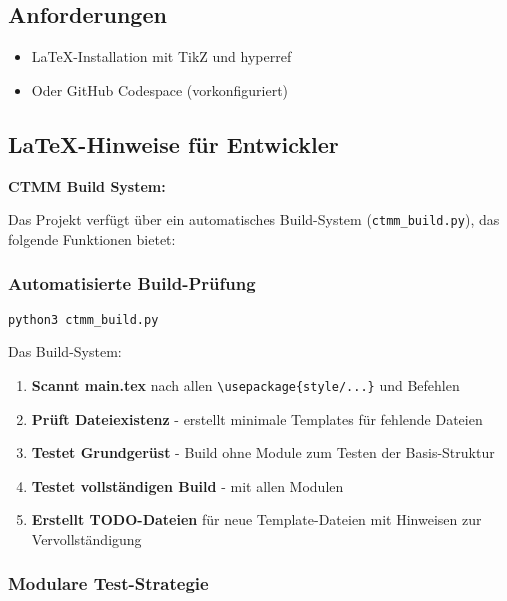 \hypertarget{anforderungen}{%
\subsection{Anforderungen}\label{anforderungen}}

\begin{itemize}
\tightlist
\item
  LaTeX-Installation mit TikZ und hyperref
\item
  Oder GitHub Codespace (vorkonfiguriert)
\end{itemize}

\hypertarget{latex-hinweise-fuer-entwickler}{%
\subsection{LaTeX-Hinweise für Entwickler}\label{latex-hinweise-fuer-entwickler}}

\textbf{CTMM Build System:}

Das Projekt verfügt über ein automatisches Build-System (\texttt{ctmm\_build.py}), das folgende Funktionen bietet:

\hypertarget{automatisierte-build-pruefung}{%
\subsubsection{Automatisierte Build-Prüfung}\label{automatisierte-build-pruefung}}

\begin{verbatim}
python3 ctmm_build.py
\end{verbatim}

Das Build-System:
\begin{enumerate}
\def\labelenumi{\arabic{enumi}.}
\tightlist
\item
  \textbf{Scannt main.tex} nach allen \verb|\usepackage{style/...}| und \verb|| Befehlen
\item
  \textbf{Prüft Dateiexistenz} - erstellt minimale Templates für fehlende Dateien
\item
  \textbf{Testet Grundgerüst} - Build ohne Module zum Testen der Basis-Struktur
\item
  \textbf{Testet vollständigen Build} - mit allen Modulen
\item
  \textbf{Erstellt TODO-Dateien} für neue Template-Dateien mit Hinweisen zur Vervollständigung
\end{enumerate}

\hypertarget{modulare-test-strategie}{%
\subsubsection{Modulare Test-Strategie}\label{modulare-test-strategie}}

